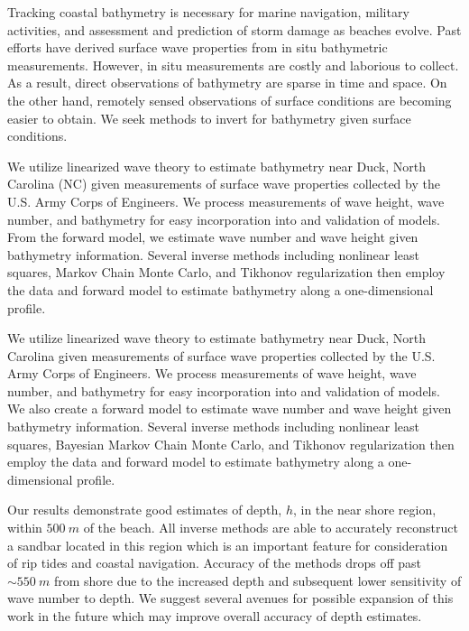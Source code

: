 Tracking coastal bathymetry is necessary for marine navigation, military activities, and assessment and prediction of storm damage as beaches evolve. Past efforts have derived surface wave properties from in situ bathymetric measurements. However, in situ measurements are costly and laborious to collect. As a result, direct observations of bathymetry are sparse in time and space. On the other hand, remotely sensed observations of surface conditions are becoming easier to obtain. We seek methods to invert for bathymetry given surface conditions. 


We utilize linearized wave theory to estimate bathymetry near Duck, North Carolina (NC) given measurements of surface wave properties collected by the U.S. Army Corps of Engineers. We process measurements of wave height, wave number, and bathymetry for easy incorporation into and validation of models. From the forward model, we estimate wave number and wave height given bathymetry information. Several inverse methods including nonlinear least squares, Markov Chain Monte Carlo, and Tikhonov regularization then employ the data and forward model to estimate bathymetry along a one-dimensional profile.

We utilize linearized wave theory to estimate bathymetry near Duck, North Carolina given measurements of surface wave properties collected by the U.S. Army Corps of Engineers. We process measurements of wave height, wave number, and bathymetry for easy incorporation into and validation of models. We also create a forward model to estimate wave number and wave height given bathymetry information. Several inverse methods including nonlinear least squares, Bayesian Markov Chain Monte Carlo, and Tikhonov regularization then employ the data and forward model to estimate bathymetry along a one-dimensional profile.


Our results demonstrate good estimates of depth, $h$, in the near shore region, within $500~m$ of the beach. All inverse methods are able to accurately reconstruct a sandbar located in this region which is an important feature for consideration of rip tides and coastal navigation. Accuracy of the methods drops off past $\sim550~m$ from shore due to the increased depth and subsequent lower sensitivity of wave number to depth. We suggest several avenues for possible expansion of this work in the future which may improve overall accuracy of depth estimates.